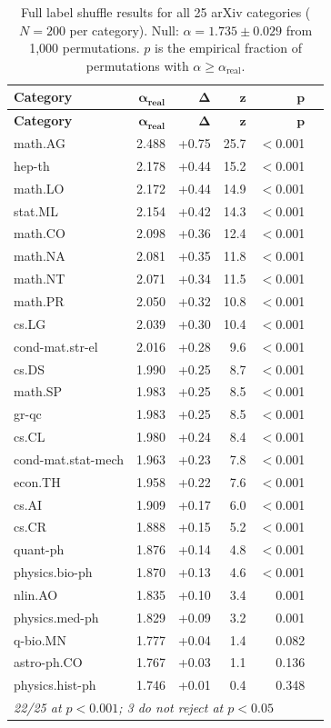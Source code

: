 \documentclass[11pt,letterpaper]{article}
\newcommand{\al}{\alpha}
\begin{document}
\begin{longtable}{lrrrrr}
\caption{Full label shuffle results for all 25 arXiv categories
($N = 200$ per category).  Null: $\al = 1.735 \pm 0.029$ from
1{,}000 permutations.  $p$ is the empirical fraction of
permutations with $\al \geq \al_{\text{real}}$.} \\
\toprule
\textbf{Category} & $\boldsymbol{\al_{\text{real}}}$ &
$\boldsymbol{\Delta}$ & $\boldsymbol{z}$ & $\boldsymbol{p}$ \\
\midrule
\endfirsthead
\toprule
\textbf{Category} & $\boldsymbol{\al_{\text{real}}}$ &
$\boldsymbol{\Delta}$ & $\boldsymbol{z}$ & $\boldsymbol{p}$ \\
\midrule
\endhead
math.AG & 2.488 & +0.75 & 25.7 & $<$0.001 \\
hep-th & 2.178 & +0.44 & 15.2 & $<$0.001 \\
math.LO & 2.172 & +0.44 & 14.9 & $<$0.001 \\
stat.ML & 2.154 & +0.42 & 14.3 & $<$0.001 \\
math.CO & 2.098 & +0.36 & 12.4 & $<$0.001 \\
math.NA & 2.081 & +0.35 & 11.8 & $<$0.001 \\
math.NT & 2.071 & +0.34 & 11.5 & $<$0.001 \\
math.PR & 2.050 & +0.32 & 10.8 & $<$0.001 \\
cs.LG & 2.039 & +0.30 & 10.4 & $<$0.001 \\
cond-mat.str-el & 2.016 & +0.28 & 9.6 & $<$0.001 \\
cs.DS & 1.990 & +0.25 & 8.7 & $<$0.001 \\
math.SP & 1.983 & +0.25 & 8.5 & $<$0.001 \\
gr-qc & 1.983 & +0.25 & 8.5 & $<$0.001 \\
cs.CL & 1.980 & +0.24 & 8.4 & $<$0.001 \\
cond-mat.stat-mech & 1.963 & +0.23 & 7.8 & $<$0.001 \\
econ.TH & 1.958 & +0.22 & 7.6 & $<$0.001 \\
cs.AI & 1.909 & +0.17 & 6.0 & $<$0.001 \\
cs.CR & 1.888 & +0.15 & 5.2 & $<$0.001 \\
quant-ph & 1.876 & +0.14 & 4.8 & $<$0.001 \\
physics.bio-ph & 1.870 & +0.13 & 4.6 & $<$0.001 \\
nlin.AO & 1.835 & +0.10 & 3.4 & 0.001 \\
physics.med-ph & 1.829 & +0.09 & 3.2 & 0.001 \\
q-bio.MN & 1.777 & +0.04 & 1.4 & 0.082 \\
astro-ph.CO & 1.767 & +0.03 & 1.1 & 0.136 \\
physics.hist-ph & 1.746 & +0.01 & 0.4 & 0.348 \\
\midrule
\multicolumn{5}{l}{\textit{22/25 at $p < 0.001$; 3 do not reject
at $p < 0.05$}} \\
\bottomrule
\end{longtable}
\end{document}
